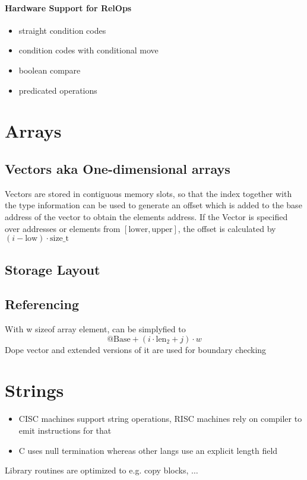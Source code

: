 \paragraph{Hardware Support for RelOps}
\begin{itemize}
	\item straight condition codes
	\item condition codes with conditional move
	\item boolean compare
	\item predicated operations
\end{itemize}


\section{Arrays}
\subsection{Vectors aka One-dimensional arrays}
Vectors are stored in contiguous memory slots, so that the index together with the type information can be used to generate an offset which is added to the base address of the vector to obtain the elements address. If the Vector is specified over addresses or elements from $[\text{lower}, \text{upper}]$, the offset is calculated by $(i-\text{low}) \cdot \text{size\_t}$

\subsection{Storage Layout}

\subsection{Referencing}
With w sizeof array element, can be simplyfied to \[ \text{@Base} + (i \cdot \text{len}_2 + j ) \cdot w\]
Dope vector and extended versions of it are used for boundary checking


\section{Strings}
\begin{itemize}
	\item CISC machines support string operations, RISC machines rely on compiler to emit instructions for that
	\item C uses null termination whereas other langs use an explicit length field
\end{itemize}
Library routines are optimized to e.g. copy blocks, $\dots$

